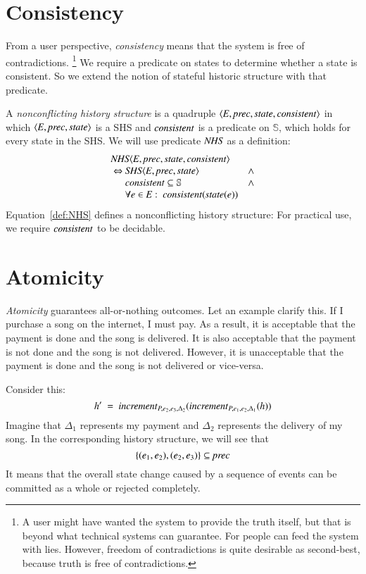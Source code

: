 \documentclass{elsarticle}
\def\id#1{\text{\it #1\/}}
\def\Events{{\mathit E}}
\begin{document}
\section{Consistency}
\label{sct:Consistency}
	From a user perspective, {\em consistency} means that the system is free of contradictions.%
\footnote{A user might have wanted the system to provide the truth itself,
	but that is beyond what technical systems can guarantee. For people can feed the system with lies.
	However, freedom of contradictions is quite desirable as second-best, because truth is free of contradictions.}
	We require a predicate on states to determine whether a state is consistent.
	So we extend the notion of stateful historic structure with that predicate.

	A {\em nonconflicting history structure} is a quadruple $\la\Events, \id{prec}, \id{state}, \id{consistent}\ra$ in which
	$\la \Events, \id{prec}, \id{state}\ra$ is a SHS and $\id{consistent}$ is a predicate on $\mathbb S$,
	which holds for every state in the SHS.
	We will use predicate $\id{NHS}$ as a definition:
\begin{equation}
\begin{array}{l@{}ll}
	\multicolumn{3}{l}{\id{NHS}\la \Events, \id{prec}, \id{state}, \id{consistent}\ra}\\
	\ \Leftrightarrow\ &\id{SHS}\la \Events, \id{prec}, \id{state}\ra&\wedge\\
	&\id{consistent}\subseteq\mathbb S&\wedge\\
	&\forall e\in\Events:\ \id{consistent}(\id{state}(e))&
\end{array}
\label{def:NHS}
\end{equation}
	Equation~\ref{def:NHS} defines a nonconflicting history structure:
	For practical use, we require $\id{consistent}$ to be decidable.

\section{Atomicity}
\label{sct:Atomicity}
	{\em Atomicity} guarantees all-or-nothing outcomes.
	Let an example clarify this.
	If I purchase a song on the internet, I must pay.
	As a result, it is acceptable that the payment is done and the song is delivered.
	It is also acceptable that the payment is not done and the song is not delivered.
	However, it is unacceptable that the payment is done and the song is not delivered or vice-versa.

	Consider this:
	\[h'\ =\ \id{increment}_{P,e_2,e_3,\Delta_2}(\id{increment}_{P,e_1,e_2,\Delta_1}(h))\]
	Imagine that $\Delta_1$ represents my payment and $\Delta_2$ represents the delivery of my song.
	In the corresponding history structure, we will see that
	\[\{(e_1,e_2), (e_2,e_3)\}\subseteq\id{prec} \]
	It means that the overall state change caused by a sequence of events can be committed as a whole or rejected completely.
\end{document}
